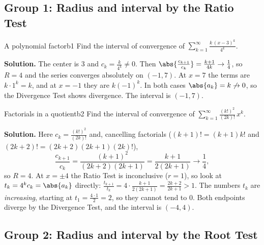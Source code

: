 \documentclass[11pt]{article}
\begin{document}
\subsection*{Group 1: Radius and interval by the Ratio Test}

\begin{exmp}{A polynomial factor}{b1}
Find the interval of convergence of $\displaystyle\sum_{k=1}^\infty\frac{k\,(x-3)^k}{4^k}$.

\textbf{Solution.} The center is $3$ and $c_k=\frac k{4^k}\ne0$. Then $\abs{\frac{c_{k+1}}{c_k}}=\frac{k+1}{4k}\to\frac14$, so $R=4$ and the series converges absolutely on $(-1,7)$. At $x=7$ the terms are $k\cdot1^k=k$, and at $x=-1$ they are $k(-1)^k$. In both cases $\abs{a_k}=k\not\to0$, so the Divergence Test shows divergence. The interval is $(-1,7)$.
\end{exmp}

\begin{exmp}{Factorials in a quotient}{b2}
Find the interval of convergence of $\displaystyle\sum_{k=1}^\infty\frac{(k!)^2}{(2k)!}\,x^k$.

\textbf{Solution.} Here $c_k=\frac{(k!)^2}{(2k)!}$ and, cancelling factorials ($(k+1)!=(k+1)k!$ and $(2k+2)!=(2k+2)(2k+1)(2k)!$),
\[
\frac{c_{k+1}}{c_k}=\frac{(k+1)^2}{(2k+2)(2k+1)}=\frac{k+1}{2(2k+1)}\to\frac14 ,
\]
so $R=4$. At $x=\pm4$ the Ratio Test is inconclusive ($r=1$), so look at $t_k=4^kc_k=\abs{a_k}$ directly: $\frac{t_{k+1}}{t_k}=4\cdot\frac{k+1}{2(2k+1)}=\frac{2k+2}{2k+1}>1$. The numbers $t_k$ are \emph{increasing}, starting at $t_1=\frac{4\cdot1}2=2$, so they cannot tend to $0$. Both endpoints diverge by the Divergence Test, and the interval is $(-4,4)$.
\end{exmp}

\subsection*{Group 2: Radius and interval by the Root Test}
\end{document}
